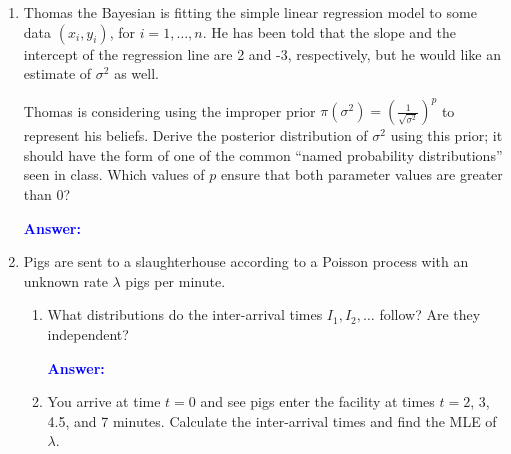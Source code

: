 \documentclass[12pt]{article}
\newcommand{\ansfont}[1]{{\textcolor{blue}{\textbf{Answer:}}\ \ #1}}
\begin{document}
\begin{enumerate}
\begin{enumerate}
\ansfont{
}
\vfill

\item What fraction of the time is the teller busy with a customer?



\ansfont{
}
\vfill

\item What is the probability that an individual entering the bank needs to wait more than 10 minutes before being served?



\ansfont{
}
\vfill
\end{enumerate}





\newpage %
\item Thomas the Bayesian is fitting the simple linear regression model to some data $(x_i, y_i)$, for $i = 1, \ldots, n$. He has been told that the slope and the intercept of the regression line are 2 and -3, respectively, but he would like an estimate of $\sigma^2$ as well.

\vspace{12pt}

Thomas is considering using the improper prior $\pi(\sigma^2) = \left( \frac{1}{\sqrt{\sigma^2}} \right)^p$ to represent his beliefs. Derive the posterior distribution of $\sigma^2$ using this prior; it should have the form of one of the common ``named probability distributions'' seen in class. Which values of $p$ ensure that both parameter values are greater than 0?



\ansfont{
}
\vfill





\newpage %
\item Pigs are sent to a slaughterhouse according to a Poisson process with an unknown rate $\lambda$ pigs per minute.
\begin{enumerate}
\item What distributions do the inter-arrival times $I_1, I_2, \ldots$ follow? Are they independent?



\ansfont{
}
\vfill

\item You arrive at time $t = 0$ and see pigs enter the facility at times $t = 2$, 3, 4.5, and 7 minutes. Calculate the inter-arrival times and find the MLE of $\lambda$.




\end{enumerate}
\end{enumerate}
\end{document}
